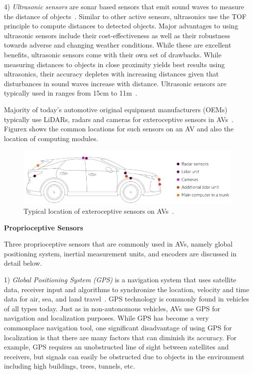 \documentclass{article}
\begin{document}
4) \emph{Ultrasonic sensors} are sonar based sensors that emit sound waves to measure the distance of objects~\cite{Campbell2018}. Similar to other active sensors, ultrasonics use the TOF principle to compute distances to detected objects. Major advantages to using ultrasonic sensors include their cost-effectiveness as well as their robustness towards adverse and changing weather conditions. While these are excellent benefits, ultrasonic sensors come with their own set of drawbacks. While measuring distances to objects in close proximity yields best results using ultrasonics, their accuracy depletes with increasing distances given that disturbances in sound waves increase with distance. Ultrasonic sensors are typically used in ranges from 15cm to 11m~\cite{USonics}.

Majority of today's automotive original equipment manufacturers (OEMs) typically use LiDARs, radars and cameras for exteroceptive sensors in AVs~\cite{AVSensors}. Figurex shows the common locations for such sensors on an AV and also the location of computing modules.


\begin{figure}[htbp]
\begin{center}
\includegraphics[scale=0.5]{figures/sensor_locations.png}
\caption{Typical location of exteroceptive sensors on AVs~\cite{AVSensors}.}
\label{fig:av_arch}
\end{center}
\end{figure}

\textbf{Proprioceptive Sensors}

Three proprioceptive sensors that are commonly used in AVs, namely global positioning system, inertial measurement units, and encoders are discussed in detail below.

1) \emph{Global Positioning System (GPS)} is a navigation system that uses satellite data, receiver input and algorithms to synchronize the location, velocity and time data for air, sea, and land travel~\cite{Campbell2018}. GPS technology is commonly found in vehicles of all types today. Just as in non-autonomous vehicles, AVs use GPS for navigation and localization purposes. While GPS has become a very commonplace navigation tool, one significant disadvantage of using GPS for localization is that there are many factors that can diminish its accuracy. For example, GPS requires an unobstructed line of sight between satellites and receivers, but signals can easily be obstructed due to objects in the environment including high buildings, trees, tunnels, etc.
\end{document}
